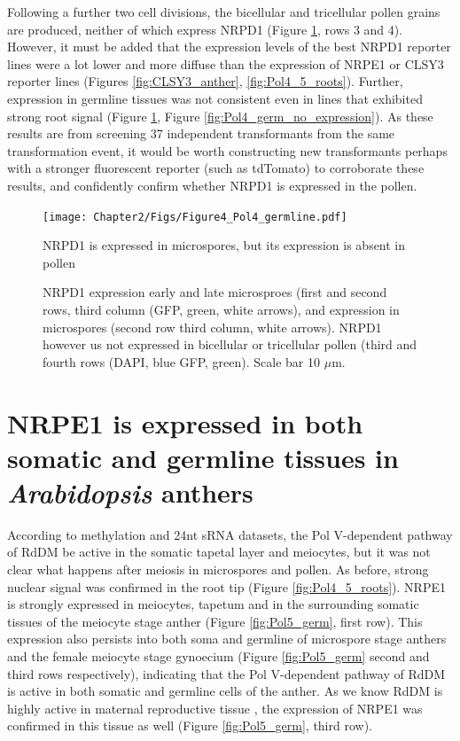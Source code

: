 Following a further two cell divisions, the bicellular and tricellular pollen grains are produced, neither of which express NRPD1 (Figure \ref{fig:Pol4_germ}, rows 3 and 4). However, it must be added that the expression levels of the best NRPD1 reporter lines were a lot lower and more diffuse than the expression of NRPE1 or CLSY3 reporter lines (Figures \ref{fig:CLSY3_anther}, \ref{fig:Pol4_5_roots}). Further, expression in germline tissues was not consistent even in lines that exhibited strong root signal (Figure \ref{fig:Pol4_germ}, Figure \ref{fig:Pol4_germ_no_expression}). As these results are from screening 37 independent transformants from the same transformation event, it would be worth constructing new transformants perhaps with a stronger fluorescent reporter (such as tdTomato) to corroborate these results, and confidently confirm whether NRPD1 is expressed in the pollen. 

\begin{figure}[htbp!] 
\centering    
    \texttt{[image: Chapter2/Figs/Figure4\_Pol4\_germline.pdf]}
\caption{NRPD1 is expressed in microspores, but its expression is absent in pollen}
\label{fig:Pol4_germ}
\captionsetup{font=small}
    \caption*{NRPD1 expression early and late microsproes (first and second rows, third column (GFP, green, white arrows), and expression in microspores (second row third column, white arrows). NRPD1 however us not expressed in bicellular or tricellular pollen (third and fourth rows (DAPI, blue GFP, green). Scale bar 10 $\mu$m.}
\end{figure}

\section{NRPE1 is expressed in both somatic and germline tissues in \textit{Arabidopsis} anthers}

According to methylation and 24nt sRNA datasets, the Pol V-dependent pathway of RdDM be active in the somatic tapetal layer and meiocytes, but it was not clear what happens after meiosis in microspores and pollen. As before, strong nuclear signal was confirmed in the root tip (Figure \ref{fig:Pol4_5_roots}). NRPE1 is strongly expressed in meiocytes, tapetum and in the surrounding somatic tissues of the meiocyte stage anther (Figure \ref{fig:Pol5_germ}, first row). This expression also persists into both soma and germline of microspore stage anthers and the female meiocyte stage gynoecium (Figure \ref{fig:Pol5_germ} second and third rows respectively), indicating that the Pol V-dependent pathway of RdDM is active in both somatic and germline cells of the anther. As we know RdDM is highly active in maternal reproductive tissue \cite{RN163,RN165}, the expression of NRPE1 was confirmed in this tissue as well (Figure \ref{fig:Pol5_germ}, third row).

